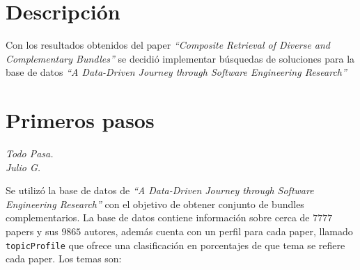 \section{Descripción}
{\begin{small}%
\begin{flushright}%
\it
\end{flushright}%
\end{small}%
\vspace{.5cm}}
Con los resultados obtenidos del paper \textit{\textquotedblleft Composite Retrieval of Diverse 
and Complementary Bundles\textquotedblright} se decidió implementar búsquedas de soluciones para la 
base de datos \textit{\textquotedblleft A Data-Driven Journey through Software 
Engineering Research\textquotedblright} \label{int:baseDeDatos}
\section{Primeros pasos}
{\begin{small}%
\begin{flushright}%
\it
Todo Pasa.\\
Julio G.
\end{flushright}%
\end{small}%
\vspace{.5cm}}
Se utilizó la base de datos de \textit{\textquotedblleft A Data-Driven Journey through Software 
Engineering Research\textquotedblright} con el objetivo de obtener conjunto de bundles 
complementarios. La base de datos contiene información sobre cerca de $7777$ papers y sus $9865$ 
autores, además cuenta con un perfil para cada paper, llamado \texttt{topicProfile} que ofrece una 
clasificación en porcentajes de que tema se refiere cada paper. Los temas son:

